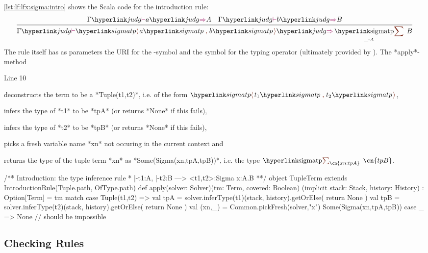 \begin{example}
\autoref{lst:lf:lfx:sigma:intro} shows the Scala code for the introduction rule:
\[
\irule{\gjudg{\infertype aA} \quad \gjudg{\infertype bB}}{\gjudg{\infertype{\pair ab}{\sigmatp{\_:A}B}}}
\]
 The rule itself has as parameters the \mmt URI for the -symbol and the symbol for the typing operator (ultimately provided by \LF). The *apply*-method
\begin{labeling}{Line 10}
	\item[Line 7] deconstructs the term to be a *Tuple(t1,t2)*, i.e. of the form $\pair{t_1}{t_2}$,
	\item[Line 8] infers the type of *t1* to be *tpA* (or returns *None* if this fails),
	\item[Line 11] infers the type of *t2* to be *tpB* (or returns *None* if this fails),
	\item[Line 14] picks a fresh variable name *xn* not occuring in the current context and
	\item[Line 15] returns the type of the tuple term *xn* as *Some(Sigma(xn,tpA,tpB))*, i.e. the type $\sigmatp{\cn{xn:tpA}}{\cn{tpB}}$.
\end{labeling}

\begin{nscalacode}[caption={Introduction Rule\protect\footnotemark },label=lst:lf:lfx:sigma:intro,emph={Sigma,Tuple}]
/** Introduction: the type inference rule 
  * |-t1:A, |-t2:B  --->  <t1,t2>:Sigma x:A.B **/
object TupleTerm extends IntroductionRule(Tuple.path, OfType.path) {
  def apply(solver: Solver)(tm: Term, covered: Boolean)
  	(implicit stack: Stack, history: History) : Option[Term]
    = tm match {
      case Tuple(t1,t2) =>
          val tpA = solver.inferType(t1)(stack, history).getOrElse(
          	return None
	  )
          val tpB = solver.inferType(t2)(stack, history).getOrElse(
          	return None
	  )
          val (xn,_) = Common.pickFresh(solver,"x")
          Some(Sigma(xn,tpA,tpB))
      case _ => None // should be impossible
    }
}
\end{nscalacode}
\end{example}

\subsection{Checking Rules}\label{sec:lf:lfx:rules:checking}

